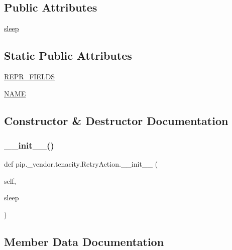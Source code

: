 \subsection*{Public Attributes}
\begin{DoxyCompactItemize}
\item 
\hyperlink{classpip_1_1__vendor_1_1tenacity_1_1RetryAction_a6f4192f95aa0220907cf3a6e7d01d5cf}{sleep}
\end{DoxyCompactItemize}
\subsection*{Static Public Attributes}
\begin{DoxyCompactItemize}
\item 
\hyperlink{classpip_1_1__vendor_1_1tenacity_1_1RetryAction_a7067aefd459462eade6a232e0593ddb5}{R\+E\+P\+R\+\_\+\+F\+I\+E\+L\+DS}
\item 
\hyperlink{classpip_1_1__vendor_1_1tenacity_1_1RetryAction_a577ab659caba0a03028d24177f8904e5}{N\+A\+ME}
\end{DoxyCompactItemize}


\subsection{Constructor \& Destructor Documentation}
\mbox{\label{classpip_1_1__vendor_1_1tenacity_1_1RetryAction_a5e34a00038c80638638009a338f4d78d}} 
\subsubsection{\texorpdfstring{\+\_\+\+\_\+init\+\_\+\+\_\+()}{\_\_init\_\_()}}
{\footnotesize\ttfamily def pip.\+\_\+vendor.\+tenacity.\+Retry\+Action.\+\_\+\+\_\+init\+\_\+\+\_\+ (\begin{DoxyParamCaption}\item[{}]{self,  }\item[{}]{sleep }\end{DoxyParamCaption})}



\subsection{Member Data Documentation}
\mbox{\label{classpip_1_1__vendor_1_1tenacity_1_1RetryAction_a577ab659caba0a03028d24177f8904e5}} 
